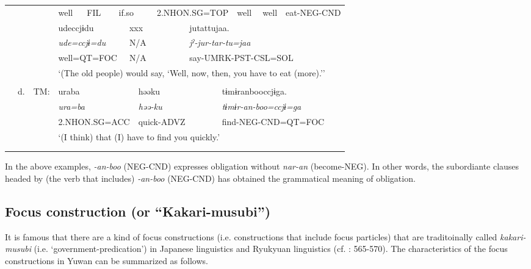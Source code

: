 \begin{tabularx}{\textwidth}{XXXXXXXXXXXXXXXXXXX}
&  &  & { well} & \multicolumn{3}{X}{{ FIL}} & \multicolumn{3}{X}{{ if.so}} & \multicolumn{3}{X}{{ 2.NHON.SG=TOP}} & \multicolumn{3}{X}{{ well}} & \multicolumn{2}{X}{{ well}} & { eat-NEG-CND}\\
&  &  & \multicolumn{5}{X}{{ udeccjɨdu}} & \multicolumn{3}{X}{{ xxx}} & \multicolumn{8}{X}{{ jutattujaa.}}\\
&  &  & \multicolumn{5}{X}{{\itshape ude=ccjɨ=du}} & \multicolumn{3}{X}{{ N/A}} & \multicolumn{8}{X}{{\itshape jˀ-jur-tar-tu=jaa}}\\
&  &  & \multicolumn{5}{X}{{ well=QT=FOC}} & \multicolumn{3}{X}{{ N/A}} & \multicolumn{8}{X}{{ say-UMRK-PST-CSL=SOL}}\\
&  &  & \multicolumn{16}{X}{{ ‘(The old people) would say, ‘Well, now, then, you have to eat (more).’’}}\\
&  & \multicolumn{17}{X}{\raggedleft [Co: 120415\_01.txt]}\\
& { d.} & { TM:} & \multicolumn{6}{X}{{ uraba}} & \multicolumn{3}{X}{{ həəku}} & \multicolumn{7}{X}{{ tɨmɨranbooccjɨga.}}\\
&  &  & \multicolumn{6}{X}{{\itshape ura=ba}} & \multicolumn{3}{X}{{\itshape həə-ku}} & \multicolumn{7}{X}{{ \textit{tɨmɨr-an-boo=ccjɨ=ga}}}\\
&  &  & \multicolumn{6}{X}{{ 2.NHON.SG=ACC}} & \multicolumn{3}{X}{{ quick-ADVZ}} & \multicolumn{7}{X}{{ find-NEG-CND=QT=FOC}}\\
&  &  & \multicolumn{16}{X}{{ ‘(I think) that (I) have to find you quickly.’}}\\
&  &  & \multicolumn{16}{X}{\raggedleft [Co: 101023\_01.txt]}\\
\lspbottomrule
\end{tabularx}
In the above examples, \textit{{}-an-boo} (NEG-CND) expresses obligation without \textit{nar-an} (become-NEG). In other words, the subordiante clauses headed by (the verb that includes) \textit{{}-an-boo} (NEG-CND) has obtained the grammatical meaning of obligation.

\subsection{Focus construction (or “Kakari-musubi”)}
\label{bkm:Ref365192124}\hypertarget{RefHeadingToc395697261}{}
It is famous that there are a kind of focus constructions (i.e. constructions that include focus particles) that are traditoinally called \textit{kakari-musubi} (i.e. ‘government-predication’) in Japanese linguistics and Ryukyuan linguistics (cf. \citealt{Shimoji2008}: 565-570). The characteristics of the focus constructions in Yuwan can be summarized as follows.

